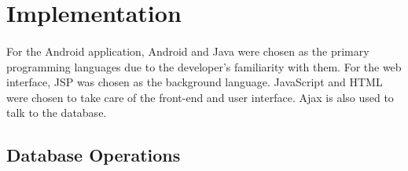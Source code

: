\section{Implementation}												
\label{sec:Implementation}
\lstset{numbers=left, breaklines=true,frame=shadowbox,
} 

\paragraph{}For the Android application, Android and Java were chosen as the primary programming languages due to the developer's familiarity with them. For the web interface, JSP was chosen as the background language. JavaScript and HTML were chosen to take care of the front-end and user interface. Ajax is also used to talk to the database. 

\subsection{Database Operations}
\label{subsec:DatabaseOperations}

